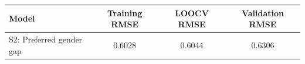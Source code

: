 \begin{tabular}{lccc}
\toprule
Model & Training RMSE & LOOCV RMSE & Validation RMSE \\
\midrule
S2: Preferred gender gap & 0.6028 & 0.6044 & 0.6306 \\
\bottomrule
\end{tabular}
